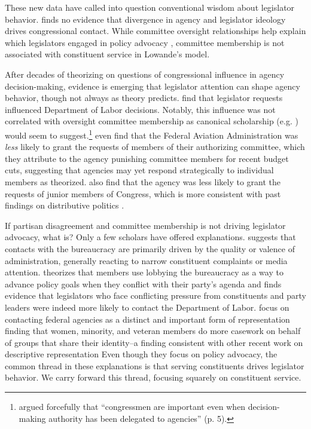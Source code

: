 \documentclass{article}
\begin{document}
These new data have called into question conventional wisdom about legislator behavior. \citet{Lowande2018JOP} finds no evidence that divergence in agency and legislator ideology drives congressional contact. While committee oversight relationships help explain which legislators engaged in policy advocacy \citep{Ritchie2017, Lowande2018JOP} , committee membership is not associated with constituent service in Lowande's model.

After decades of theorizing on questions of congressional influence in agency decision-making, evidence is emerging that legislator attention can shape agency behavior, though not always as theory predicts. \citet{RitchieYou2018} find that legislator requests influenced Department of Labor decisions. Notably, this influence was not correlated with oversight committee membership as canonical scholarship (e.g. \citet{Arnold1979}) would seem to suggest.\footnote{\citet{Arnold1979} argued forcefully that ``congressmen are important even when decision-making authority has been delegated to agencies'' (p. 5).} \citet{MillsKalafHuges2015} even find that the Federal Aviation Administration was \emph{less} likely to grant the requests of members of their authorizing committee, which they attribute to the agency punishing committee members for recent budget cuts, suggesting that agencies may yet respond strategically to individual members as \citet{Arnold1979} theorized. \citet{MillsKalafHuges2015} also find that the agency was less likely to grant the requests of junior members of Congress, which is more consistent with past findings on distributive politics \citep{Lazarus2010}. 

If partisan disagreement and committee membership is not driving legislator advocacy, what is? Only a few scholars have offered explanations.
\citet{Lowande2018JOP} suggests that contacts with the bureaucracy are primarily driven by the quality or valence of administration, generally reacting to narrow constituent complaints or media attention. 
\citet{Ritchie2017} theorizes that members use lobbying the bureaucracy as a way to advance policy goals when they conflict with their party's agenda and finds evidence that legislators who face conflicting pressure from constituents and party leaders were indeed more likely to contact the Department of Labor. 
\citet{LowandeRitchieLauterbach2018} focus on contacting federal agencies as a distinct and important form of representation finding that women, minority, and veteran members do more casework on behalf of groups that share their identity--a finding consistent with other recent work on descriptive representation %
Even though they focus on policy advocacy, the common thread in these explanations is that serving constituents drives legislator behavior. We carry forward this thread, focusing squarely on constituent service. 
\end{document}
